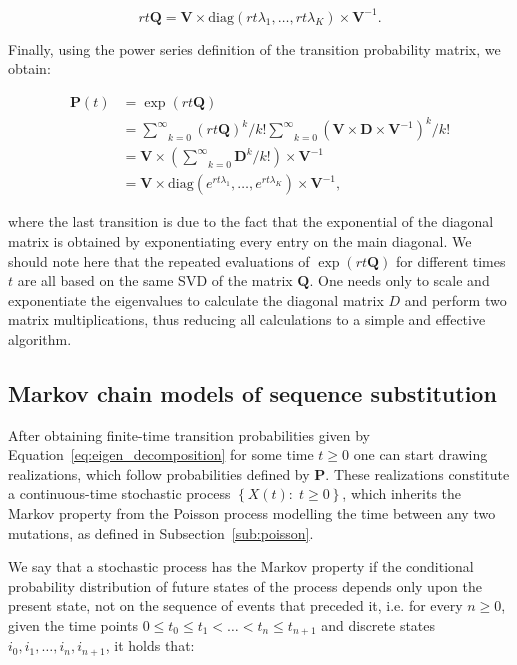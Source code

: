 \begin{equation}
rt\mathbf{Q}=\mathbf{V}\times\text{diag}(rt\lambda_{1},\ldots,rt\lambda_{K})\times\mathbf{V}^{-1} .
\end{equation}

\noindent Finally, using the power series definition of the transition probability matrix, we obtain: 

\begin{align}
\mathbf{P}(t) & =  \exp\left(rt\mathbf{Q}\right) \nonumber \\
& =   \underset{k=0}{\overset{\infty}{\sum}}\left(rt\mathbf{Q}\right)^{k}/k! \underset{k=0}{\overset{\infty}{\sum}}\left(\mathbf{V}\times\mathbf{D}\times\mathbf{V}^{-1}\right)^{k}/k! \nonumber \\
& =  \mathbf{V}\times\left(\underset{k=0}{\overset{\infty}{\sum}}\mathbf{D}^{k}/k!\right)\times\mathbf{V}^{-1} \nonumber \\
& =  \mathbf{V}\times\text{diag}(e^{rt\lambda_{1}},\ldots,e^{rt\lambda_{K}})\times\mathbf{V}^{-1} ,
\label{eq:eigen_decomposition}
\end{align}

\noindent 
where the last transition is due to the fact that the exponential of the diagonal matrix is obtained by exponentiating every entry on the main diagonal.
We should note here that the repeated evaluations of $\exp\left(rt\mathbf{Q}\right)$ for different times $t$ are all based on the same SVD of the matrix $\mathbf{Q}$. 
One needs only to scale and exponentiate the eigenvalues to calculate the diagonal matrix $D$ and perform two matrix multiplications, thus reducing all calculations to a simple and effective algorithm. 

\subsection{Markov chain models of sequence substitution\label{sub:subst_models}}

After obtaining finite-time transition probabilities given by Equation~\ref{eq:eigen_decomposition} for some time $t\geq0$ one can start drawing realizations, which follow probabilities defined by $\mathbf{P}$.
These realizations constitute a continuous-time stochastic process $\left\{ X(t):\; t\geq0\right\}$, which inherits the Markov property from the Poisson process modelling the time between any two mutations, as defined in Subsection~\ref{sub:poisson}.

We say that a stochastic process has the Markov property if the conditional probability distribution of future states of the process depends only upon the present state, not on the sequence of events that preceded it, i.e. for every $n\geq 0$, given the time points $0\leq t_{0}\leq t_{1}<\ldots<t_{n}\leq t_{n+1}$ and discrete states $i_{0},i_{1}, \ldots, i_{n},i_{n+1}$, it holds that: 

